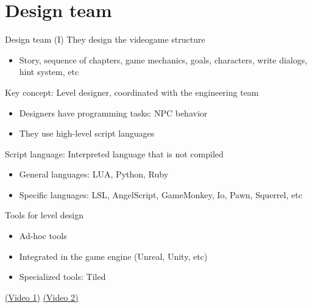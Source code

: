 \documentclass[10pt,compress]{beamer} %
\begin{document}
\section{Design team}
\begin{frame}{Design team (I)}
	They design the videogame structure
		\begin{itemize}
		\item Story, sequence of chapters, game mechanics, goals, characters, write dialogs, hint system, etc
		\end{itemize}
	Key concept: \alert{Level designer}, coordinated with the engineering team
		\begin{itemize}
		\item Designers have programming tasks: NPC behavior
		\item They use high-level script languages
		\end{itemize}
	Script language: Interpreted language that is not compiled
		\begin{itemize}
		\item General languages: LUA, Python, Ruby
		\item Specific languages: LSL, AngelScript, GameMonkey, Io, Pawn, Squerrel, etc
		\end{itemize}
    Tools for level design
        \begin{itemize}
            \item Ad-hoc tools
            \item Integrated in the game engine (Unreal, Unity, etc)
            \item Specialized tools: Tiled
        \end{itemize}
	\href{http://www.youtube.com/watch?v=KoEGyk6amq0}{(Video 1)} \href{http://www.youtube.com/watch?v=ELKi3hJkSwE}{(Video 2)} \\
\end{frame}
\end{document}
